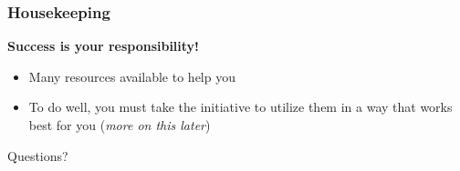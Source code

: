 \documentclass[10pt]{beamer}
\begin{document}
\begin{frame}[t]
\frametitle{Housekeeping}
\vspace{0.5cm}

	\begin{center}
		\textbf{Success is your responsibility!}
	\end{center}	

	\vspace{0.5cm}
	
	\begin{itemize}
		\item Many resources available to help you
		\bigskip
		\item To do well, you must take the initiative to utilize them in a way that works best for you (\emph{more on this later})
		\bigskip
	\end{itemize}	
\end{frame}


\begin{frame}
	\begin{center}
		\Huge{\textcolor{myblue}{Questions?}}
	\end{center}	
\end{frame}
	
\end{document}
